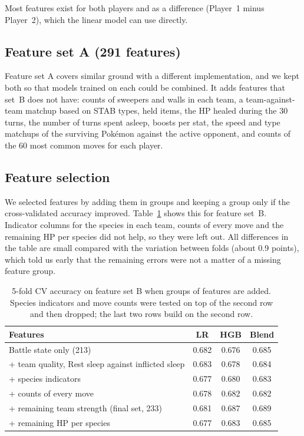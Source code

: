 \documentclass[11pt,a4paper]{article}
\begin{document}
Most features exist for both players and as a difference (Player~1 minus Player~2), which the
linear model can use directly.

\subsection{Feature set A (291 features)}

Feature set A covers similar ground with a different implementation, and we kept both so that
models trained on each could be combined. It adds features that set~B does not have: counts of
sweepers and walls in each team, a team-against-team matchup based on STAB types, held items, the
HP healed during the 30 turns, the number of turns spent asleep, boosts per stat, the speed and
type matchups of the surviving Pokémon against the active opponent, and counts of the 60 most
common moves for each player.

\subsection{Feature selection}

We selected features by adding them in groups and keeping a group only if the cross-validated
accuracy improved. Table~\ref{tab:featexp} shows this for feature set~B. Indicator columns for the
species in each team, counts of every move and the remaining HP per species did not help, so they
were left out. All differences in the table are small compared with the variation between folds
(about 0.9 points), which told us early that the remaining errors were not a matter of a missing
feature group.

\begin{table}[H]
\centering\small
\begin{tabular}{@{}lccc@{}}
\toprule
Features & LR & HGB & Blend \\
\midrule
Battle state only (213) & 0.682 & 0.676 & 0.685 \\
+ team quality, Rest sleep against inflicted sleep & 0.683 & 0.678 & 0.684 \\
+ species indicators & 0.677 & 0.680 & 0.683 \\
+ counts of every move & 0.678 & 0.682 & 0.682 \\
+ remaining team strength (final set, 233) & 0.681 & 0.687 & 0.689 \\
+ remaining HP per species & 0.677 & 0.683 & 0.685 \\
\bottomrule
\end{tabular}
\caption{5-fold CV accuracy on feature set B when groups of features are added. Species indicators
and move counts were tested on top of the second row and then dropped; the last two rows build on
the second row.}
\label{tab:featexp}
\end{table}
\end{document}
